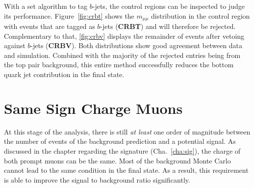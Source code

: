 With a set algorithm to tag $b$-jets, the control regions can be inspected to judge its performance. Figure~\ref{fig:crbt} shows the $m_{\mu \mu}$ distribution in the control region with events that are tagged as $b$-jets (\textbf{CRBT}) and will therefore be rejected. Complementary to that, \ref{fig:crbv} displays the remainder of events after vetoing against $b$-jets (\textbf{CRBV}). Both distributions show good agreement between data and simulation. Combined with the majority of the rejected entries being from the top pair background, this entire method successfully reduces the bottom quark jet contribution in the final state.


\section{Same Sign Charge Muons}
\label{sec:sscmuons}

At this stage of the analysis, there is still \textit{at least} one order of magnitude between the number of events of the background prediction and a potential signal. As discussed in the chapter regarding the signature (Cha.~\ref{cha:sig}), the charge of both prompt muons can be the same. Most of the background Monte Carlo cannot lead to the same condition in the final state. As a result, this requirement is able to improve the signal to background ratio significantly.

